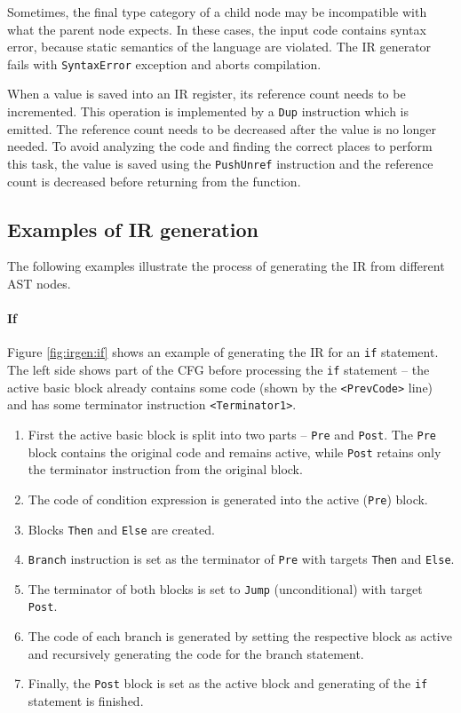 Sometimes, the final type category of a child node may be incompatible with what the parent node expects. In these cases, the input code contains syntax error, because static semantics of the language are violated. The IR generator fails with \texttt{SyntaxError} exception and aborts compilation.

When a value is saved into an IR register, its reference count needs to be incremented. This operation is implemented by a \texttt{Dup} instruction which is emitted. The reference count needs to be decreased after the value is no longer needed. To avoid analyzing the code and finding the correct places to perform this task, the value is saved using the \texttt{PushUnref} instruction and the reference count is decreased before returning from the function.


\subsection{Examples of IR generation}

The following examples illustrate the process of generating the IR from different AST nodes.

\pagebreak
\paragraph{If} Figure \ref{fig:irgen:if} shows an example of generating the IR for an \texttt{if} statement. The left side shows part of the CFG before processing the \texttt{if} statement -- the active basic block already contains some code (shown by the \texttt{<PrevCode>} line) and has some terminator instruction \texttt{<Terminator1>}.


\begin{enumerate}[noitemsep]
    \item First the active basic block is split into two parts -- \texttt{Pre} and \texttt{Post}. The \texttt{Pre} block contains the original code and remains active, while \texttt{Post} retains only the terminator instruction from the original block.
    \item The code of condition expression is generated into the active (\texttt{Pre}) block.
    \item Blocks \texttt{Then} and \texttt{Else} are created.
    \item \texttt{Branch} instruction is set as the terminator of \texttt{Pre} with targets \texttt{Then} and \texttt{Else}.
    \item The terminator of both blocks is set to \texttt{Jump} (unconditional) with target \texttt{Post}.
    \item The code of each branch is generated by setting the respective block as active and recursively generating the code for the branch statement.
    \item Finally, the \texttt{Post} block is set as the active block and generating of the \texttt{if} statement is finished.
\end{enumerate}

